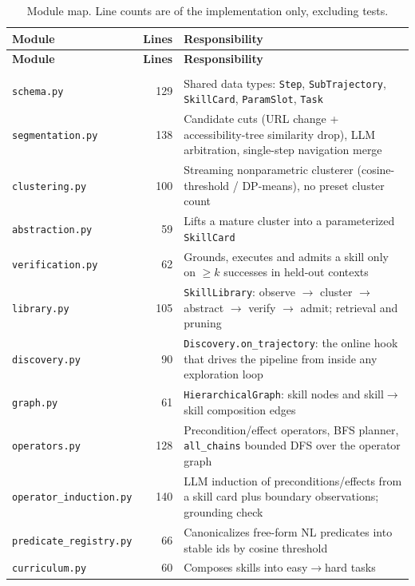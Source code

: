 {\footnotesize
\begin{longtable}{@{}L{4.3cm}rL{8.0cm}@{}}
\caption[Module map of the HSGE implementation]{Module map. Line counts are of
the implementation only, excluding tests.}
\label{tab:app-modules}\\
\toprule
\textbf{Module} & \textbf{Lines} & \textbf{Responsibility} \\
\midrule
\endfirsthead
\toprule
\textbf{Module} & \textbf{Lines} & \textbf{Responsibility} \\
\midrule
\endhead
\bottomrule
\endfoot
{} \\
\midrule
\texttt{schema.py}      & 129 & Shared data types: \texttt{Step},
\texttt{SubTrajectory}, \texttt{SkillCard}, \texttt{ParamSlot}, \texttt{Task} \\
\texttt{segmentation.py} & 138 & Candidate cuts (URL change + accessibility-tree
similarity drop), LLM arbitration, single-step navigation merge \\
\texttt{clustering.py}  & 100 & Streaming nonparametric clusterer
(cosine-threshold / DP-means), no preset cluster count \\
\texttt{abstraction.py} &  59 & Lifts a mature cluster into a parameterized
\texttt{SkillCard} \\
\texttt{verification.py} &  62 & Grounds, executes and admits a skill only on
$\geq k$ successes in held-out contexts \\
\texttt{library.py}     & 105 & \texttt{SkillLibrary}: observe $\rightarrow$
cluster $\rightarrow$ abstract $\rightarrow$ verify $\rightarrow$ admit;
retrieval and pruning \\
\texttt{discovery.py}   &  90 & \texttt{Discovery.on\_trajectory}: the online
hook that drives the pipeline from inside any exploration loop \\
\texttt{graph.py}       &  61 & \texttt{HierarchicalGraph}: skill nodes and
skill$\rightarrow$skill composition edges \\
\texttt{operators.py}   & 128 & Precondition/effect operators, BFS planner,
\texttt{all\_chains} bounded DFS over the operator graph \\
\texttt{operator\_induction.py} & 140 & LLM induction of preconditions/effects
from a skill card plus boundary observations; grounding check \\
\texttt{predicate\_registry.py} &  66 & Canonicalizes free-form NL predicates
into stable ids by cosine threshold \\
\texttt{curriculum.py}  &  60 & Composes skills into easy$\rightarrow$hard tasks \\

\end{longtable}}
